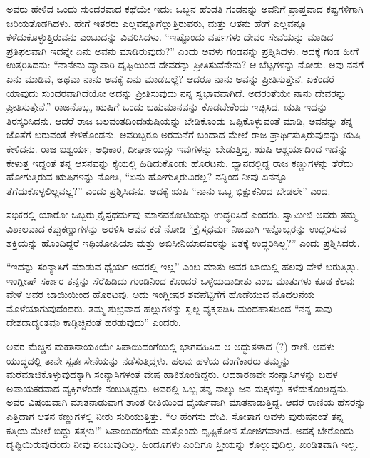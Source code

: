 ಅವರು ಹೇಳಿದ ಒಂದು ಸುಂದರವಾದ ಕಥೆಯೇ ಇದು: ಒಬ್ಬನ ಹೆಂಡತಿ ಗಂಡನನ್ನು ಅವನಿಗೆ ಪ್ರಾಪ್ತವಾದ ಕಷ್ಟಗಳಿಗಾಗಿ ಜರಿಯತೊಡಗಿದಳು. ಹೇಗೆ ಇತರರು ಎಲ್ಲವನ್ನೂ\break ಗೆಲ್ಲುತ್ತಿರುವರು, ಮತ್ತು ಆತನು ಹೇಗೆ ಎಲ್ಲವನ್ನೂ ಕಳೆದುಕೊಳ್ಳುತ್ತಿರುವನು ಎಂಬುದನ್ನು ವಿವರಿಸಿದಳು. “ಇಷ್ಟೊಂದು ವರ್ಷಗಳು ದೇವರ ಸೇವೆಯನ್ನು ಮಾಡಿದ ಪ್ರತಿಫಲವಾಗಿ ಇದನ್ನೇ ಏನು ಅವನು ಮಾಡಿರುವುದು?” ಎಂದು ಅವಳು ಗಂಡನನ್ನು ಪ್ರಶ್ನಿಸಿದಳು. ಅದಕ್ಕೆ ಗಂಡ ಹೀಗೆ ಉತ್ತರಿಸಿದನು: “ನಾನೇನು ವ್ಯಾಪಾರಿ ದೃಷ್ಟಿಯಿಂದ ದೇವರನ್ನು ಪ್ರೀತಿಸುವೆನೇನು? ಆ ಬೆಟ್ಟಗಳನ್ನು ನೋಡು. ಅವು ನನಗೆ ಏನು ಮಾಡಿವೆ, ಅಥವಾ ನಾನು ಅವಕ್ಕೆ ಏನು ಮಾಡಬಲ್ಲೆ? ಆದರೂ ನಾನು ಅವನ್ನು ಪ್ರೀತಿಸುತ್ತೇನೆ. ಏಕೆಂದರೆ ಯಾವುದು ಸುಂದರವಾಗಿದೆಯೋ ಅದನ್ನು ಪ್ರೀತಿಸುವುದು ನನ್ನ ಸ್ವಭಾವವಾಗಿದೆ. ಅದರಂತೆಯೇ ನಾನು ದೇವರನ್ನು ಪ್ರೀತಿಸುತ್ತೇನೆ.” ರಾಜನೊಬ್ಬ, ಋಷಿಗೆ ಒಂದು ಬಹುಮಾನವನ್ನು ಕೊಡಬೇಕೆಂದು ಇಚ್ಛಿಸಿದ. ಋಷಿ ಇದನ್ನು ತಿರಸ್ಕರಿಸಿದನು. ಆದರೆ ರಾಜ ಬಲವಂತದಿಂದ\break ಋಷಿಯನ್ನು ಬೇಡಿಕೊಂಡು ಒಪ್ಪಿಕೊಳ್ಳುವಂತೆ ಮಾಡಿ, ಅವನನ್ನು ತನ್ನ ಜೊತೆಗೆ ಬರುವಂತೆ ಕೇಳಿಕೊಂಡನು. ಅವರಿಬ್ಬರೂ ಅರಮನೆಗೆ ಬಂದಾದ ಮೇಲೆ ರಾಜ ಪ್ರಾರ್ಥಿಸುತ್ತಿರುವುದನ್ನು ಋಷಿ ಕೇಳಿದನು. ರಾಜ ಐಶ್ವರ್ಯ, ಅಧಿಕಾರ, ದೀರ್ಘಾಯಸ್ಸು ಇವುಗಳನ್ನು ಬೇಡುತ್ತಿದ್ದ. ಋಷಿ ಆಶ್ಚರ್ಯದಿಂದ ಇದನ್ನು ಕೇಳುತ್ತ ಇದ್ದಂತೆ ತನ್ನ ಆಸನವನ್ನು ಕೈಯಲ್ಲಿ ಹಿಡಿದುಕೊಂಡು ಹೊರಟನು. ಧ್ಯಾನದಲ್ಲಿದ್ದ ರಾಜ ಕಣ್ಣುಗಳನ್ನು ತೆರೆದು ಹೋಗುತ್ತಿರುವ ಋಷಿಗಳನ್ನು ನೋಡಿ, “ಏನು ಹೋಗುತ್ತಿರುವಿರಲ್ಲ? ನನ್ನಿಂದ ನೀವು ಏನನ್ನೂ ತೆಗೆದುಕೊಳ್ಳಲಿಲ್ಲವಲ್ಲ?” ಎಂದು ಪ್ರಶ್ನಿಸಿದನು. ಅದಕ್ಕೆ ಋಷಿ “ನಾನು ಒಬ್ಬ ಭಿಕ್ಷುಕನಿಂದ ಬೇಡಲೇ” ಎಂದ.

\vskip 7pt

ಸಭಿಕರಲ್ಲಿ ಯಾರೋ ಒಬ್ಬರು ಕ್ರೈಸ್ತಧರ್ಮವು ಮಾನವಕೋಟಿಯನ್ನು ಉದ್ಧರಿಸಿದೆ ಎಂದರು. ಸ್ವಾಮೀಜಿ ಅವರು ತಮ್ಮ ವಿಶಾಲವಾದ ಕಪ್ಪುಕಣ್ಣುಗಳನ್ನು ಅರಳಿಸಿ ಅವನ ಕಡೆ ನೋಡಿ “ಕ್ರೈಸ್ತಧರ್ಮ ನಿಜವಾಗಿ ಇನ್ನೊಬ್ಬರನ್ನು ಉದ್ದರಿಸುವ ಶಕ್ತಿಯನ್ನು ಹೊಂದಿದ್ದರೆ ಇಥಿಯೋಪಿಯಾ ಮತ್ತು ಅಬಿಸೀನಿಯಾದವರನ್ನು ಏತಕ್ಕೆ ಉದ್ಧರಿಸಿಲ್ಲ?” ಎಂದು ಪ್ರಶ್ನಿಸಿದರು.

\vskip 7pt

“ಇದನ್ನು ಸಂನ್ಯಾಸಿಗೆ ಮಾಡುವ ಧೈರ್ಯ ಅವರಲ್ಲಿ ಇಲ್ಲ” ಎಂಬ ಮಾತು ಅವರ ಬಾಯಲ್ಲಿ ಹಲವು ವೇಳೆ ಬರುತ್ತಿತ್ತು. ಇಂಗ್ಲೀಷ್​ ಸರ್ಕಾರ ತನ್ನನ್ನು ಸೆರೆಹಿಡಿದು ಗುಂಡಿನಿಂದ ಕೊಂದರೆ ಒಳ್ಳೆಯದಾದೀತು ಎಂಬ ಮಾತುಗಳು ಕೂಡ ಕೆಲವು ವೇಳೆ ಅವರ ಬಾಯಿಯಿಂದ ಹೊರಟವು. ಅದು ಇಂಗ್ಲೀಷರ ಶವಪೆಟ್ಟಿಗೆಗೆ ಹೊಡೆಯುವ ಮೊದಲನೆಯ ಮೊಳೆಯಾಗುವುದೆಂದರು. ತಮ್ಮ ಶುಭ್ರವಾದ ಹಲ್ಲುಗಳನ್ನು ಸ್ವಲ್ಪ ವ್ಯಕ್ತಪಡಿಸಿ ಮಂದಹಾಸದಿಂದ “ನನ್ನ ಸಾವು ದೇಶದಾದ್ಯಂತವೂ ಕಾಡ್ಗಿಚ್ಚಿನಂತೆ ಹರಡುವುದು” ಎಂದರು.

\vskip 7pt

ಅವರ ಮೆಚ್ಚಿನ ಮಹಾನಾಯಕಿಯೇ ಸಿಪಾಯಿದಂಗೆಯಲ್ಲಿ ಭಾಗವಹಿಸಿದ ಆ ಅದ್ಭುತಳಾದ (?) ರಾಣಿ. ಅವಳು ಯುದ್ಧದಲ್ಲಿ ತಾನೇ ಸ್ವತಃ ಸೇನೆಯನ್ನು ನಡೆಸುತ್ತಿದ್ದಳು. ಹಲವು ಹಳೆಯ ದಂಗೆಕಾರರು ತಮ್ಮನ್ನು ಮರೆಮಾಚಿಕೊಳ್ಳುವುದಕ್ಕಾಗಿ ಸಂನ್ಯಾಸಿಗಳಂತೆ ವೇಷ ಹಾಕಿಕೊಂಡಿದ್ದರು. ಆದಕಾರಣವೇ ಸಂನ್ಯಾಸಿಗಳನ್ನು ಬಹಳ ಅಪಾಯಕರವಾದ ವ್ಯಕ್ತಿಗಳೆಂದೇ ನಂಬುತ್ತಿದ್ದರು. ಅವರಲ್ಲಿ ಒಬ್ಬ ತನ್ನ ನಾಲ್ಕು ಜನ ಮಕ್ಕಳನ್ನು ಕಳೆದುಕೊಂಡಿ\-ದ್ದನು. ಅವರ ವಿಷಯವಾಗಿ ಮಾತನಾಡುವಾಗ ಶಾಂತ ರೀತಿಯಿಂದ ಧೈರ್ಯವಾಗಿ ಮಾತನಾಡುತ್ತಿದ್ದ. ಆದರೆ ರಾಣಿಯ ಹೆಸರನ್ನು ಎತ್ತಿದಾಗ ಆತನ ಕಣ್ಣುಗಳಲ್ಲಿ ನೀರು ಸುರಿಯುತ್ತಿತ್ತು. “ಆ ಹೆಂಗಸು ದೇವಿ, ಸೋತಾಗ ಅವಳು ಪುರುಷನಂತೆ ತನ್ನ ಕತ್ತಿಯ ಮೇಲೆ ಬಿದ್ದು ಸತ್ತಳು!” ಸಿಪಾಯಿದಂಗೆಯ ಮತ್ತೊಂದು ದೃಷ್ಟಿಕೋನ ಸೋಜಿಗವಾಗಿದೆ. ಅದಕ್ಕೆ ಬೇರೊಂದು ದೃಷ್ಟಿಯಿರುವುದೆಂದು ನೀವು ನಂಬುವುದಿಲ್ಲ. ಹಿಂದೂಗಳು ಎಂದಿಗೂ ಸ್ತ್ರೀಯನ್ನು ಕೊಲ್ಲುವುದಿಲ್ಲ. ಖಂಡಿತವಾಗಿ ಇಲ್ಲ.

\vspace{-0.5cm}

